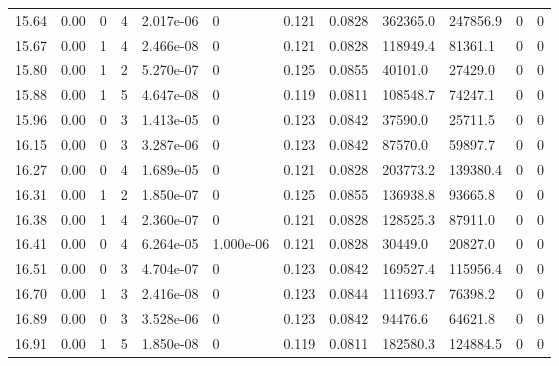 \documentclass[preview]{standalone}
\begin{document}
{{{{\begin{tabular}{L{1.2cm}C{1.2cm} C{0.3cm}C{0.5cm} C{1.4cm}C{1.4cm} C{1.4cm}C{1.4cm} C{1.6cm}C{1.6cm} C{1.6cm}C{1.6cm}}
  15.64  &  0.00  & 0     &  4 &  2.017e-06  & 0  &  0.121&   0.0828& 362365.0 & 247856.9   &  0 & 0  \\ 
  15.67  &  0.00  & 1     &  4 &  2.466e-08  & 0  &  0.121&   0.0828& 118949.4 & 81361.1   &  0 & 0  \\ 
  15.80  &  0.00  & 1     &  2 &  5.270e-07  & 0  &  0.125&   0.0855& 40101.0 & 27429.0   &  0 & 0  \\ 
  15.88  &  0.00  & 1     &  5 &  4.647e-08  & 0  &  0.119&   0.0811& 108548.7 & 74247.1   &  0 & 0  \\ 
  15.96  &  0.00  & 0     &  3 &  1.413e-05  & 0  &  0.123&   0.0842& 37590.0 & 25711.5   &  0 & 0  \\ 
  16.15  &  0.00  & 0     &  3 &  3.287e-06  & 0  &  0.123&   0.0842& 87570.0 & 59897.7   &  0 & 0  \\ 
  16.27  &  0.00  & 0     &  4 &  1.689e-05  & 0  &  0.121&   0.0828& 203773.2 & 139380.4   &  0 & 0  \\ 
  16.31  &  0.00  & 1     &  2 &  1.850e-07  & 0  &  0.125&   0.0855& 136938.8 & 93665.8   &  0 & 0  \\ 
  16.38  &  0.00  & 1     &  4 &  2.360e-07  & 0  &  0.121&   0.0828& 128525.3 & 87911.0   &  0 & 0  \\ 
  16.41  &  0.00  & 0     &  4 &  6.264e-05  & 1.000e-06  &  0.121&   0.0828& 30449.0 & 20827.0   &  0 & 0  \\ 
  16.51  &  0.00  & 0     &  3 &  4.704e-07  & 0  &  0.123&   0.0842& 169527.4 & 115956.4   &  0 & 0  \\ 
  16.70  &  0.00  & 1     &  3 &  2.416e-08  & 0  &  0.123&   0.0844& 111693.7 & 76398.2   &  0 & 0  \\ 
  16.89  &  0.00  & 0     &  3 &  3.528e-06  & 0  &  0.123&   0.0842& 94476.6 & 64621.8   &  0 & 0  \\ 
  16.91  &  0.00  & 1     &  5 &  1.850e-08  & 0  &  0.119&   0.0811& 182580.3 & 124884.5   &  0 & 0  \\ 
\hline 
\end{tabular} 

}}}}
\end{document}
